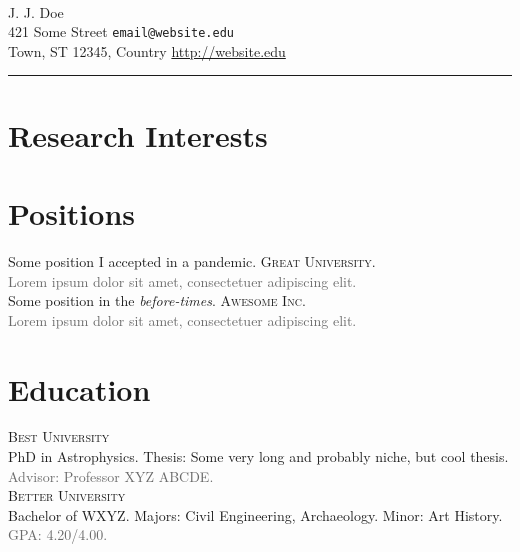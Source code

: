 \documentclass[12pt]{article}
\newcommand{\smallitem}[1]{\small\textcolor{dimgray}{#1}}
\begin{document}
\begin{fullpagesection}
    \begin{flushleft}
        \hfill{\updateinfo} \\
        
        {\huge J. J. Doe} \\[5pt]
        
        421 Some Street \hfill \texttt{email@website.edu} \\
        
        Town, ST 12345, Country \hfill \url{http://website.edu}
    \end{flushleft}
    \centering\rule{7.4in}{1pt}\par
\end{fullpagesection}

\section{Research Interests}
\lipsum[75]

\section{Positions}
 Some position I accepted in a pandemic. \textsc{Great University}.\\
\smallitem{Lorem ipsum dolor sit amet, consectetuer adipiscing elit.}\\

 Some position in the \textit{before-times}. \textsc{Awesome Inc.}\\
\smallitem{Lorem ipsum dolor sit amet, consectetuer adipiscing elit.}

\section{Education}
\textsc{Best University}\\ 
PhD in Astrophysics. Thesis: Some very long and probably niche, but cool thesis.\\
\smallitem{Advisor: Professor XYZ ABCDE.}\\

\textsc{Better University}\\
Bachelor of WXYZ. Majors: Civil Engineering, Archaeology. Minor: Art History.\\
\smallitem{GPA: 4.20/4.00.}
\end{document}
